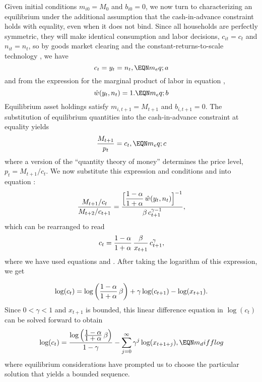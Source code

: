 Given initial conditions $m_{i0}=M_0$ and $b_{i0}=0$, we now turn to
characterizing an equilibrium under the additional assumption that the
cash-in-advance constraint  holds with equality, even when
it does not bind.
Since all households are perfectly symmetric, they will make
identical consumption and labor decisions,  $c_{it}=c_t$ and $n_{it}=n_t$,
so by goods market clearing and the constant-returns-to-scale technology
, we have
$$
c_t = y_t = n_t,                                               \EQN m_eq;a
$$
and from the expression for the marginal product of labor
in equation ,
$$
\hat w(y_t,n_t) = 1.                                         \EQN m_eq;b
$$
Equilibrium asset holdings
satisfy $m_{i,t+1}=M_{t+1}$ and $b_{i,t+1}=0$. The substitution of equilibrium
quantities into the cash-in-advance constraint  at equality yields
$$
{M_{t+1} \over p_t} = c_{t},                                  \EQN m_eq;c
$$
where a version of the ``quantity theory of money''
%
 determines the price level, $p_t=M_{t+1}/c_t$.  We now
substitute this expression and conditions  and 
into equation :
$$
{M_{t+1}/c_t \over M_{t+2}/c_{t+1}} =
  { \displaystyle \Bigl[{1- \alpha \over 1+ \alpha} \,
\hat w(y_t,n_{t})\Bigr]^{-1}
        \over \beta \, c_{t+1}^{\gamma -1} },
$$
which can be rearranged to read
$$
c_t = {1- \alpha \over 1+ \alpha}\, {\beta \over x_{t+1}}\, c_{t+1}^{\gamma},
$$
where we have used equations  and .
After taking the logarithm of this expression, we get

$$
\log(c_t) = \log\left({1- \alpha \over 1+ \alpha}\,\beta\right)
            + \gamma \log(c_{t+1}) - \log(x_{t+1}).
$$
Since $0<\gamma<1$ and $x_{t+1}$ is bounded, this linear difference equation
in $\log(c_t)$ can be solved forward to obtain
$$
\log(c_t) = { \log\left( {\displaystyle 1-\alpha \over
\displaystyle 1+\alpha}\,
                          \beta \right) \over 1-\gamma }
          - \sum_{j=0}^{\infty} \gamma^j \log(x_{t+1+j}),    \EQN m_difflog
$$
where equilibrium considerations have prompted us to choose the particular
solution that yields a bounded sequence.


